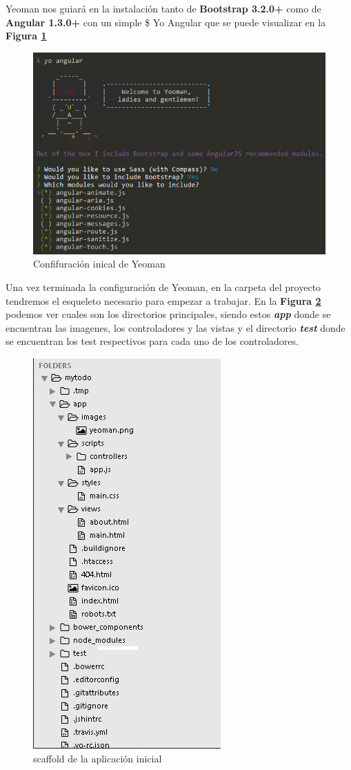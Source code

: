 Yeoman nos guiará en la instalación tanto de \textbf{Bootstrap 3.2.0+} como de  \textbf{Angular 1.3.0+} con un simple \$ Yo Angular que se puede visualizar en  la \textbf{Figura \ref{yeomanInstall}}

\begin{figure}[h]
  \centering
  \includegraphics[width=.4\textwidth]{img/tp1_parte2/0-instalacionConYeoman}
  \caption{Confifuración inical de Yeoman}
  \label{yeomanInstall}
\end{figure}

Una vez terminada la configuración de Yeoman, en la carpeta del proyecto tendremos el esqueleto necesario para empezar a trabajar. En la  \textbf{Figura \ref{scaffold}} podemos ver cuales son los directorios principales, siendo estos \textbf{\textit{app}} donde se encuentran las imagenes, los controladores y las vistas y el directorio \textbf{\textit{test}} donde se encuentran los test respectivos para cada uno de los controladores.

\begin{figure}[h]
  \centering
  \includegraphics[width=.4\textwidth]{img/tp1_parte2/0-scaffold}
  \caption{scaffold de la aplicación inicial}
  \label{scaffold}
\end{figure}


